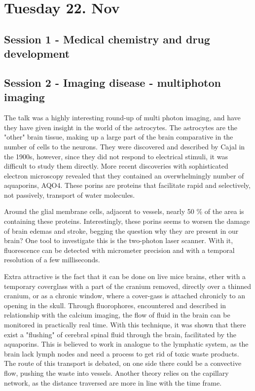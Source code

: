 \documentclass[12p]{article}
\begin{document}
\section*{Tuesday 22. Nov}
\subsection*{Session 1 - Medical chemistry and drug development}

\subsection*{Session 2 - Imaging disease - multiphoton imaging}

The talk was a highly interesting round-up of multi photon imaging, and have they have given insight in the world of the astrocytes.
The astrocytes are the "other" brain tissue, making up a large part of the brain comparative in the number of cells to the neurons.
They were discovered and described by Cajal in the 1900s, however, since they did not respond to electrical stimuli, it was difficult to study them directly.
More recent discoveries with sophisticated electron microscopy revealed that they contained an overwhelmingly number of aquaporins, AQO4.
These porins are proteins that facilitate rapid and selectively, not passively, transport of water molecules.

Around the glial membrane cells, adjacent to vessels, nearly 50 \% of the area is containing these proteins.
Interestingly, these porins seems to worsen the damage of brain edemas and stroke, begging the question why they are present in our brain?
One tool to investigate this is the two-photon laser scanner.
With it, fluorescence can be detected with micrometer precision and with a temporal resolution of a few milliseconds.

Extra attractive is the fact that it can be done on live mice brains, ether with a temporary coverglass with a part of the cranium removed, directly over a thinned cranium, or as a chronic window, where a cover-gass is attached chronicly to an opening in the skull.
Through fluorophores, encountered and described in relationship with the calcium imaging, the flow of fluid in the brain can be monitored in practically real time.
With this technique, it was shown that there exist a "flushing" of cerebral spinal fluid through the brain, facilitated by the aquaporins.
This is believed to work in analogue to the lymphatic system, as the brain lack lymph nodes and need a process to get rid of toxic waste products.
The route of this transport is debated, on one side there could be a convective flow, pushing the waste into vessels.
Another theory relies on the capillary network, as the distance traversed are more in line with the time frame.
\end{document}
